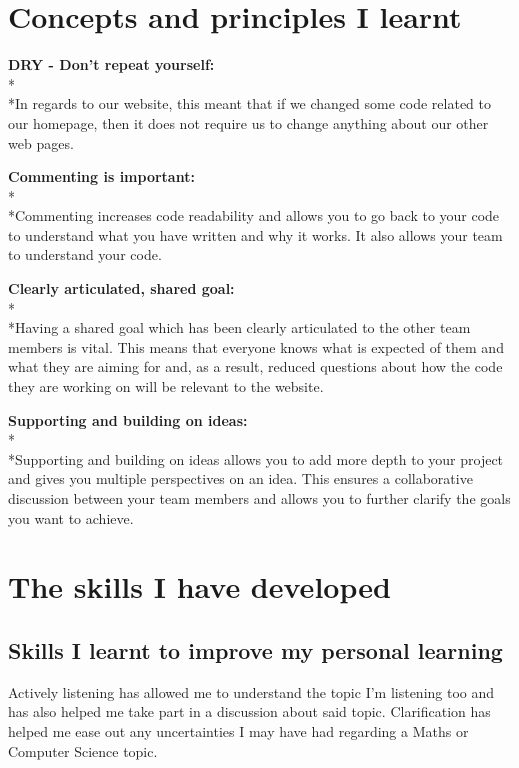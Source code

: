 \documentclass[12pt,a4paper]{article}
\begin{document}
\newpage
\section{Concepts and principles I learnt}

\textbf{DRY - Don’t repeat yourself:}
		\\*\\*In regards to our website, this meant that if we changed some code related
		to our homepage, then it does not require us to change anything about our
		other web pages.
		
\textbf{Commenting is important:}
		\\*\\*Commenting increases code readability and allows you to go back to your code
		to understand what you have written and why it works.
		It also allows your team to understand your code.
		
\textbf{Clearly articulated, shared goal:}
		\\*\\*Having a shared goal which has been clearly articulated to the other team members
		is vital. This means that everyone knows what is expected of them and what they are aiming
		for and, as a result, reduced questions about how the code they are working on will be relevant
		to the website.

\textbf{Supporting and building on ideas:}
		\\*\\*Supporting and building on ideas allows you to add more depth to your project
		and gives you multiple perspectives on an idea. This ensures a collaborative
		discussion between your team members and allows you to further clarify the goals
		you want to achieve.
		
\newpage
\section{The skills I have developed}

\subsection{Skills I learnt to improve my personal learning}

Actively listening has allowed me to understand the topic I'm listening too and has 
also helped me take part in a discussion about said topic.
Clarification has helped me ease out any uncertainties I may have had regarding a Maths or Computer
Science topic.
\end{document}
